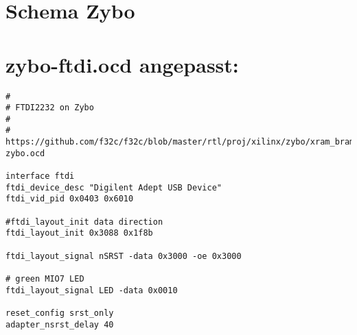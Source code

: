 






\section{Schema Zybo}
\label{anhang:schemaZybo}






\section{zybo-ftdi.ocd angepasst:}
\label{anhang:zybo-ftdi.cfg}
\lstset{language=tcl}
\begin{lstlisting}
#
# FTDI2232 on Zybo
#
#  https://github.com/f32c/f32c/blob/master/rtl/proj/xilinx/zybo/xram_bram_hdmi_ise/ftdi-zybo.ocd 

interface ftdi
ftdi_device_desc "Digilent Adept USB Device"
ftdi_vid_pid 0x0403 0x6010

#ftdi_layout_init data direction
ftdi_layout_init 0x3088 0x1f8b

ftdi_layout_signal nSRST -data 0x3000 -oe 0x3000

# green MIO7 LED
ftdi_layout_signal LED -data 0x0010

reset_config srst_only
adapter_nsrst_delay 40
\end{lstlisting}

\label{anhang:zynq_7000.cfg}




